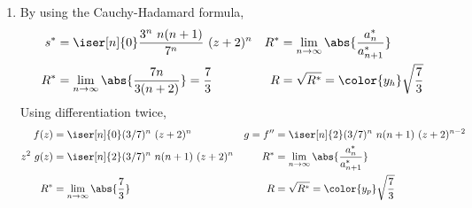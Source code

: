 \begin{enumerate}
    \item By using the Cauchy-Hadamard formula,
          \begin{align}
              s^* & = \iser[n]{0} \frac{3^n\ n(n+1)}{7^n}\ (z + 2)^n            &
              R^* & = \lim_{n \to \infty} \abs{\frac{a^*_n}
              {a^*_{n+1}}}                                                        \\
              R^* & = \lim_{n \to \infty} \abs{\frac{7n}{3(n+2)}} = \frac{7}{3} &
              R   & = \sqrt{R^*} = \color{y_h} \sqrt{\frac{7}{3}}
          \end{align}
          Using differentiation twice,
          \begin{align}
              f(z)      & = \iser[n]{0} (3/7)^n\ (z+2)^n                &
              g = f''   & = \iser[n]{2} (3/7)^n\ n(n+1)\ (z+2)^{n-2}      \\
              z^2\ g(z) & = \iser[n]{2} (3/7)^n\ n(n+1)\ (z+2)^{n}      &
              R^*       & = \lim_{n \to \infty} \abs{\frac{a^*_n}
              {a^*_{n+1}}}                                                \\
              R^*       & = \lim_{n \to \infty} \abs{\frac{7}{3}}       &
              R         & = \sqrt{R^*} = \color{y_p} \sqrt{\frac{7}{3}}
          \end{align}


\end{enumerate}
